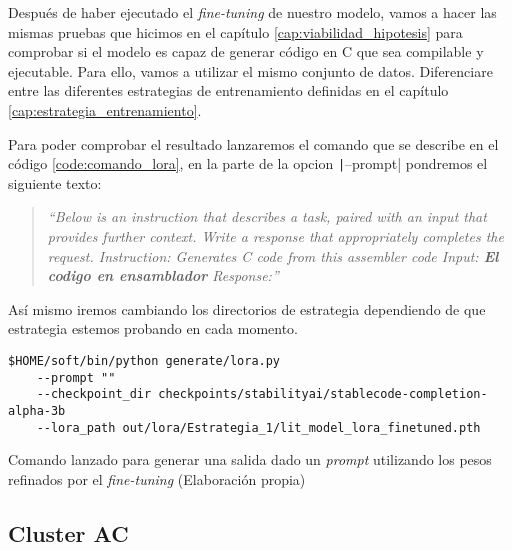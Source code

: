 
Después de haber ejecutado el \textit{fine-tuning} de nuestro modelo, vamos a hacer las mismas pruebas
que hicimos en el capítulo \ref{cap:viabilidad_hipotesis} para comprobar si el modelo es capaz de
generar código en C que sea compilable y ejecutable. Para ello, vamos a utilizar el mismo conjunto
de datos. Diferenciare entre las diferentes estrategias de entrenamiento definidas en el capítulo
\ref{cap:estrategia_entrenamiento}.

Para poder comprobar el resultado lanzaremos el comando que se describe en el código \ref{code:comando_lora},
en la parte de la opcion \texttt|--prompt| pondremos el siguiente texto:

\begin{quote}
    \textit{``Below is an instruction that describes a task, paired with an input that provides further context.
    Write a response that appropriately completes the request. \newline
    Instruction: Generates C code from this assembler code \newline
    Input: \textbf{El codigo en ensamblador}\newline
    Response:''}
\end{quote}

Así mismo iremos cambiando los directorios de estrategia dependiendo de que estrategia estemos probando
en cada momento.

\begin{mycode}
    \begin{verbatim}
$HOME/soft/bin/python generate/lora.py 
    --prompt "" 
    --checkpoint_dir checkpoints/stabilityai/stablecode-completion-alpha-3b 
    --lora_path out/lora/Estrategia_1/lit_model_lora_finetuned.pth 
    \end{verbatim}
    \caption[Comando lanzado para generar una salida dado un \textit{prompt} utilizando los pesos refinados por el \textit{fine-tuning}]{Comando lanzado para generar una salida dado un \textit{prompt} utilizando los pesos refinados por el \textit{fine-tuning} (Elaboración propia)}
    \label{code:comando_lora}
\end{mycode}

\subsection{Cluster AC}
\label{subsec:cluster_ac}

